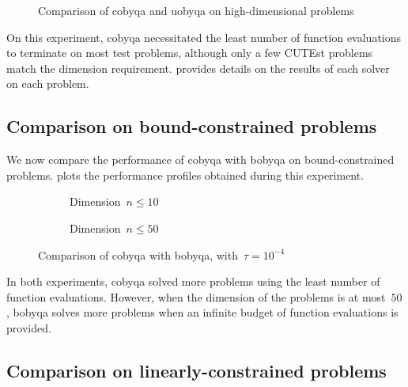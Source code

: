 \begin{figure}[ht]
    \centering
    \caption{Comparison of \gls{cobyqa} and \gls{uobyqa} on high-dimensional problems}
    \label{fig:cobyqa-uobyqa-unconstrained}
\end{figure}

On this experiment, \gls{cobyqa} necessitated the least number of function evaluations to terminate on most test problems, although only a few CUTEst problems match the dimension requirement.
 provides details on the results of each solver on each problem.

\subsection{Comparison on bound-constrained problems}

We now compare the performance of \gls{cobyqa} with \gls{bobyqa} on bound-constrained problems.
 plots the performance profiles obtained during this experiment.


\begin{figure}[ht]
    \centering
    \begin{subfigure}[b]{0.49\textwidth}
        \centering
        \caption{Dimension~$n \le 10$}
    \end{subfigure}
    \hfill
    \begin{subfigure}[b]{0.49\textwidth}
        \centering
        \caption{Dimension~$n \le 50$}
    \end{subfigure}
    \caption{Comparison of \gls{cobyqa} with \gls{bobyqa}, with~$\tau = 10^{-4}$}
    \label{fig:cobyqa-bobyqa-bound-constrained}
\end{figure}

In both experiments, \gls{cobyqa} solved more problems using the least number of function evaluations.
However, when the dimension of the problems is at most~$50$, \gls{bobyqa} solves more problems when an infinite budget of function evaluations is provided.

\subsection{Comparison on linearly-constrained problems}
\label{subsec:comparison-cobyqa-lincoa}

